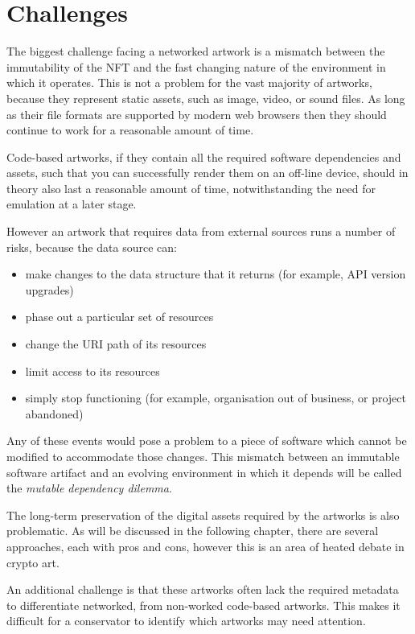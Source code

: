 \section{Challenges}
\label{sec:challenges}

The biggest challenge facing a networked artwork is a mismatch between the immutability of the NFT and the fast changing nature of the environment in which it operates. This is not a problem for the vast majority of artworks, because they represent static assets, such as image, video, or sound files. As long as their file formats are supported by modern web browsers then they should continue to work for a reasonable amount of time.

Code-based artworks, if they contain all the required software dependencies and assets, such that you can successfully render them on an off-line device, should in theory also last a reasonable amount of time, notwithstanding the need for emulation at a later stage.

However an artwork that requires data from external sources runs a number of risks, because the data source can:

\begin{itemize}
    \item make changes to the data structure that it returns (for example, API version upgrades)
    \item phase out a particular set of resources
    \item change the URI path of its resources
    \item limit access to its resources
    \item simply stop functioning (for example, organisation out of business, or project abandoned)
\end{itemize}

Any of these events would pose a problem to a piece of software which cannot be modified to accommodate those changes. This mismatch between an immutable software artifact and an evolving environment in which it depends will be called the \emph{mutable dependency dilemma}.

The long-term preservation of the digital assets required by the artworks is also problematic. As will be discussed in the following chapter, there are several approaches, each with pros and cons, however this is an area of heated debate in crypto art.

An additional challenge is that these artworks often lack the required metadata to differentiate networked, from non-worked code-based artworks. This makes it difficult for a conservator to identify which artworks may need attention.


